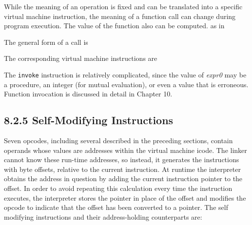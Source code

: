 While the meaning of an operation is fixed and can be translated into
a specific virtual machine instruction, the meaning of a function call
can change during program execution. The value of the function also
can be computed. as in


The general form of a call is

The corresponding virtual machine instructions are

\goodbreak
{}

The \texttt{invoke} instruction is relatively complicated, since the
value of \textit{expr0 }may be a procedure, an integer (for mutual
evaluation), or even a value that is erroneous. Function invocation is
discussed in detail in Chapter 10.

\subsection[8.2.5 Self-Modifying Instructions]{8.2.5 Self-Modifying Instructions}

Seven opcodes, including several described in the preceding
sections, contain operands whose values are addresses within the
virtual machine icode. The linker cannot know these run-time
addresses, so instead, it generates the instructions with byte
offsets, relative to the current instruction.  At runtime the
interpreter obtains the address in question by adding the current
instruction pointer to the offset.  In order to avoid repeating this
calculation every time the instruction executes, the interpreter
stores the pointer in place of the offset and modifies the opcode to
indicate that the offset has been converted to a pointer.  The self
modifying instructions and their address-holding counterparts are:


